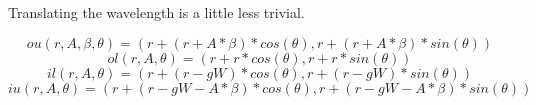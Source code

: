 \documentclass[12pt]{report}
\begin{document}
\begin{normalsize}
Translating the wavelength is a little less trivial.

\begin{equation}
ou(r,A,\beta,\theta) = (r+(r+A*\beta) * cos(\theta),r+(r+A*\beta)*sin(\theta))
\end{equation}
\begin{equation}
ol(r,A,\theta) = (r+r* cos(\theta),r+r*sin(\theta))
\end{equation}
\begin{equation}
il(r,A,\theta) = (r+(r-gW)*cos(\theta), r+(r-gW)*sin(\theta))
\end{equation}
\begin{equation}
iu(r,A,\theta) = (r+(r-gW-A*\beta)*cos(\theta), r+(r-gW-A*\beta)*sin(\theta))
\end{equation}
\end{normalsize}
\end{document}
